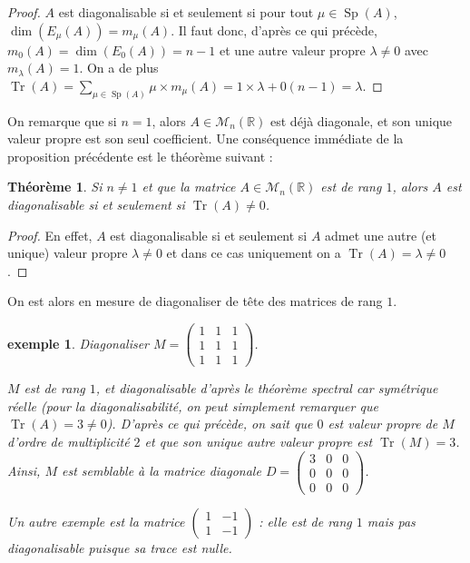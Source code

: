 \documentclass[a4paper]{article}
\newtheorem*{theorem}{Théorème}
\newtheorem*{example}{exemple}
\begin{document}
\begin{proof}
    $A$ est diagonalisable si et seulement si pour tout $\mu \in \operatorname{Sp}(A)$, $\dim(E_\mu(A)) = m_\mu(A)$. Il faut donc, d'après ce qui précède, $m_0(A) = \dim(E_0(A)) = n-1$ et une autre valeur propre $\lambda \neq 0$ avec $m_\lambda(A) = 1$. On a de plus $\displaystyle \operatorname{Tr}(A) = \!\!\!\!\!\! \sum_{\mu \in \operatorname{Sp}(A)} \!\!\!\!\! \mu \times m_\mu(A) = 1\times \lambda + 0(n-1) = \lambda$.
\end{proof}

On remarque que si $n=1$, alors $A \in \mathcal{M}_{n}(\mathbb{R})$ est déjà diagonale, et son unique valeur propre est son seul coefficient. Une conséquence immédiate de la proposition précédente est le théorème suivant :

\begin{theorem}
    Si $n \neq 1$ et que la matrice $A \in \mathcal{M}_{n}(\mathbb{R})$ est de rang $1$, alors $A$ est diagonalisable si et seulement si $\operatorname{Tr}(A) \neq 0$.
\end{theorem}

\begin{proof}
    En effet, $A$ est diagonalisable si et seulement si $A$ admet une autre (et unique) valeur propre $\lambda \neq 0$ et dans ce cas uniquement on a $\operatorname{Tr}(A) = \lambda \neq 0$. 
\end{proof}

On est alors en mesure de diagonaliser de tête des matrices de rang $1$.

\begin{example}
    Diagonaliser $M = \begin{pmatrix} 1 & 1 & 1 \\ 1 & 1 & 1 \\ 1 & 1 & 1 \end{pmatrix}$.
    
    $M$ est de rang $1$, et diagonalisable d'après le théorème spectral car symétrique réelle (pour la diagonalisabilité, on peut simplement remarquer que $\operatorname{Tr}(A) = 3 \neq 0$). D'après ce qui précède, on sait que $0$ est valeur propre de $M$ d'ordre de multiplicité $2$ et que son unique autre valeur propre est $\operatorname{Tr}(M) = 3$. Ainsi, $M$ est semblable à la matrice diagonale $D = \begin{pmatrix} 3 & 0 & 0 \\ 0 & 0 & 0 \\ 0 & 0 & 0 \end{pmatrix}$.
    
    Un autre exemple est la matrice $\begin{pmatrix}1 & -1 \\ 1 & -1\end{pmatrix}$ : elle est de rang $1$ mais pas diagonalisable puisque sa trace est nulle.
\end{example}
\end{document}
